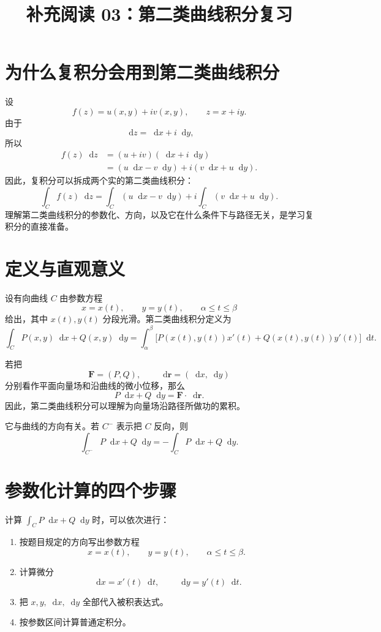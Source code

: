 \documentclass[UTF8,11pt]{ctexart}
\title{\textcolor{courseblue}{补充阅读 03：第二类曲线积分复习}}
\author{}
\date{}
\newcommand{\dif}{\mathop{}\!\mathrm{d}}
\begin{document}
\maketitle
\vspace{-2.2em}

\section{为什么复积分会用到第二类曲线积分}

设
\[
f(z)=u(x,y)+iv(x,y),\qquad z=x+iy.
\]
由于
\[
\dif z=\dif x+i\dif y,
\]
所以
\[
\begin{aligned}
f(z)\dif z
&=(u+iv)(\dif x+i\dif y)\\
&=(u\dif x-v\dif y)+i(v\dif x+u\dif y).
\end{aligned}
\]
因此，复积分可以拆成两个实的第二类曲线积分：
\[
\boxed{
\int_C f(z)\dif z
=\int_C(u\dif x-v\dif y)
+i\int_C(v\dif x+u\dif y).
}
\]
理解第二类曲线积分的参数化、方向，以及它在什么条件下与路径无关，是学习复积分的直接准备。

\section{定义与直观意义}

设有向曲线 $C$ 由参数方程
\[
x=x(t),\qquad y=y(t),\qquad \alpha\leq t\leq\beta
\]
给出，其中 $x(t),y(t)$ 分段光滑。第二类曲线积分定义为
\[
\boxed{
\int_C P(x,y)\dif x+Q(x,y)\dif y
=\int_\alpha^\beta
\big[P(x(t),y(t))x'(t)+Q(x(t),y(t))y'(t)\big]\dif t.
}
\]

若把
\[
\mathbf F=(P,Q),\qquad \dif\mathbf r=(\dif x,\dif y)
\]
分别看作平面向量场和沿曲线的微小位移，那么
\[
P\dif x+Q\dif y=\mathbf F\cdot\dif\mathbf r.
\]
因此，第二类曲线积分可以理解为向量场沿路径所做功的累积。

它与曲线的方向有关。若 $C^{-}$ 表示把 $C$ 反向，则
\[
\int_{C^-}P\dif x+Q\dif y
=-\int_C P\dif x+Q\dif y.
\]

\section{参数化计算的四个步骤}

计算
\(
\int_C P\dif x+Q\dif y
\)
时，可以依次进行：
\begin{enumerate}
  \item 按题目规定的方向写出参数方程
        \[
        x=x(t),\qquad y=y(t),\qquad \alpha\leq t\leq\beta.
        \]
  \item 计算微分
        \[
        \dif x=x'(t)\dif t,
        \qquad
        \dif y=y'(t)\dif t.
        \]
  \item 把 $x,y,\dif x,\dif y$ 全部代入被积表达式。
  \item 按参数区间计算普通定积分。
\end{enumerate}
\end{document}
